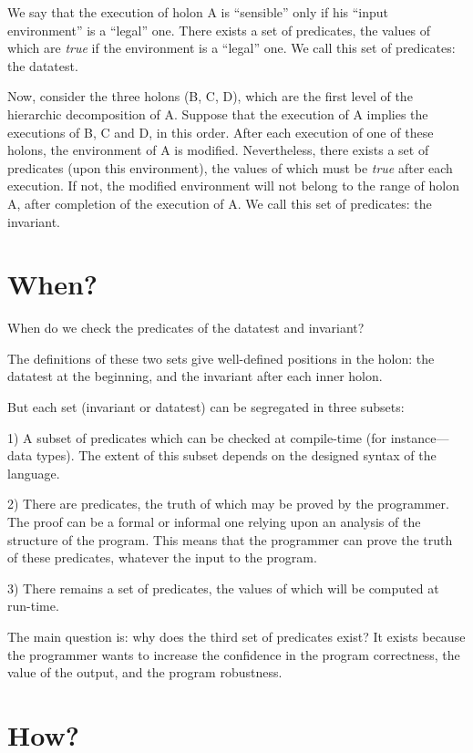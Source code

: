 \documentclass[openany,nobib]{tufte-book}
\begin{document}
We say that the execution of holon A is ``sensible'' only if his ``input
environment'' is a ``legal'' one. There exists a set of predicates, the values
of which are {\sl true} if the environment is a ``legal'' one. We call this set
of predicates: the datatest.

Now, consider the three holons (B, C, D), which are the first level of the
hierarchic decomposition of A. Suppose that the execution of A implies the
executions of B, C and D, in this order. After each execution of one of these
holons, the environment of A is modified. Nevertheless, there exists a set of
predicates (upon this environment), the values of which must be {\sl true}
after each execution. If not, the modified environment will not belong to the
range of holon A, after completion of the execution of A. We call this set of
predicates: the invariant.

\section{When?}

When do we check the predicates of the datatest and invariant?

The definitions of these two sets give well-defined positions in the holon: the
datatest at the beginning, and the invariant after each inner holon.

But each set (invariant or datatest) can be segregated in three subsets:

1) A subset of predicates which can be checked at compile-time (for
instance---data types). The extent of this subset depends on the designed
syntax of the language.

2) There are predicates, the truth of which may be proved by the programmer.
The proof can be a formal or informal one relying upon an analysis of the
structure of the program. This means that the programmer can prove the truth of
these predicates, whatever the input to the program.

3) There remains a set of predicates, the values of which will be computed at
run-time.

The main question is: why does the third set of predicates exist? It exists
because the programmer wants to increase the confidence in the program
correctness, the value of the output, and the program robustness.

\section{How?}
\end{document}

